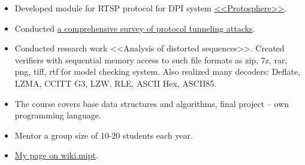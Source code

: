 \documentclass[10pt,a4paper,normalphoto]{altacv}
\begin{document}
\begin{itemize}
\item Developed module for RTSP protocol for DPI system \href{https://www.ispras.ru/en/technologies/protosphere/}{<<Protosphere>>}.
\item Conducted \href{https://github.com/Panterrich/FTE/blob/master/fte.pdf}{a comprehensive survey of protocol tunneling attacks}.
\item Conducted research work <<Analysis of distorted sequences>>.
Created verifiers with sequential memory access to such file formats as zip, 7z, rar, png, tiff, rtf for model checking system.
Also realized many decoders: Deflate, LZMA, CCITT G3, LZW, RLE, ASCII Hex, ASCII85.
\end{itemize}

\medskip

\begin{itemize}
    \item The course covers base data structures and algorithms, final project -- own programming language.
    \item Mentor a group size of 10-20 students each year.
    \item \href{https://wiki.mipt.tech/index.php/%D0%94%D1%83%D1%80%D0%BD%D0%BE%D0%B2%5F%D0%90%D0%BB%D0%B5%D0%BA%D1%81%D0%B5%D0%B9%5F%D0%9D%D0%B8%D0%BA%D0%BE%D0%BB%D0%B0%D0%B5%D0%B2%D0%B8%D1%87}{My page on wiki.mipt}.
\end{itemize}

\divider

\clearpage
\end{document}
